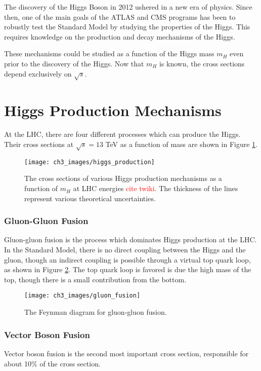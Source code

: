 \documentclass[10pt,a4paper]{book}
\newcommand\todo[1]{\textcolor{red}{#1}}
\begin{document}
The discovery of the Higgs Boson in 2012 \cite{ATLAS:2012yve} ushered in a new era of physics. Since then, one of the main goals of the ATLAS and CMS programs has been to robustly test the Standard Model by studying the properties of the Higgs. This requires knowledge on the production and decay mechanisms of the Higgs. 

These mechanisms could be studied as a function of the Higgs mass $m_{H}$ even prior to the discovery of the Higgs. Now that $m_{H}$ is known, the cross sections depend exclusively on $\sqrt{s}$. 

\section{Higgs Production Mechanisms}

At the LHC, there are four different processes which can produce the Higgs. Their cross sections at $\sqrt{s} = 13$ TeV as a function of mass are shown in Figure \ref{Higgs production}. 

\begin{figure}
\centering
\texttt{[image: ch3\_images/higgs\_production]}
\caption{The cross sections of various Higgs production mechanisms as a function of $m_H$ at LHC energies \todo{cite twiki}. The thickness of the lines represent various theoretical uncertainties.}
\label{Higgs production}
\end{figure}

\subsubsection{Gluon-Gluon Fusion}
Gluon-gluon fusion is the process which dominates Higgs production at the LHC.
In the Standard Model, there is no direct coupling between the Higgs and the gluon, though an indirect coupling is possible through a virtual top quark loop, as shown in Figure \ref{gg fusion}. The top quark loop is favored is due the high mass of the top, though there is a small contribution from the bottom.

\begin{figure}[h!]
\centering
\texttt{[image: ch3\_images/gluon\_fusion]}
\caption{The Feynman diagram for gluon-gluon fusion.}
\label{gg fusion}
\end{figure}
\subsubsection{Vector Boson Fusion}
Vector boson fusion is the second most important cross section, responsible for about 10\% of the cross section. 
\end{document}
